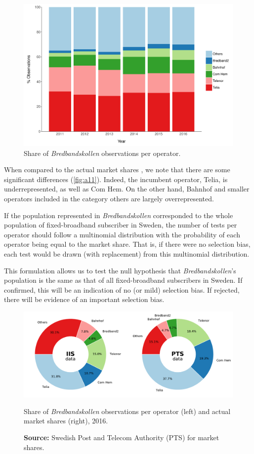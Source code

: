 \documentclass[12pt]{article}
\begin{document}
\begin{figure}[H]
    \centering
        \includegraphics[width=0.95\linewidth]{byoperator_barchart.pdf}
        \caption{Share of \textit{Bredbandskollen} observations per operator.}
        \label{fig:a10}
\end{figure}   

When compared to the actual market shares \citep{pts2016}, we note that there are some significant differences (\autoref{fig:a11}). Indeed, the incumbent operator, Telia, is underrepresented, as well as Com Hem. On the other hand, Bahnhof and smaller operators included in the category others are largely overrepresented. 

If the population represented in \textit{Bredbandskollen} corresponded to the whole population of fixed-broadband subscriber in Sweden, the number of tests per operator should follow a multinomial distribution with the probability of each operator being equal to the market share. That is, if there were no selection bias, each test would be drawn (with replacement) from this multinomial distribution.

This formulation allows us to test the null hypothesis that \textit{Bredbandskollen}'s population is the same as that of all fixed-broadband subscribers in Sweden. If confirmed, this will be an indication of no (or mild) selection bias. If rejected, there will be evidence of an important selection bias.  

\begin{figure}[H]
    \centering
        \includegraphics[width=\linewidth]{donuts_operators.pdf}
        \caption{Share of \textit{Bredbandskollen} observations per operator (left) and actual market shares (right), 2016.}
        \label{fig:a11}
        \caption*{\textbf{Source:} Swedish Post and Telecom Authority (PTS) for market shares.}
\end{figure}   
\end{document}
